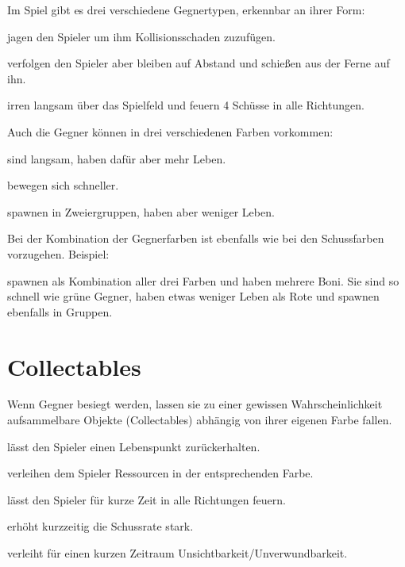 \documentclass[a4paper,10pt,ngerman,fontsize=12pt]{scrreprt}
\begin{document}
Im Spiel gibt es drei verschiedene Gegnertypen, erkennbar an ihrer Form:

\renewcommand{\itmspace}{4.5em}
{jagen den Spieler um ihm Kollisionsschaden zuzufügen.}

{verfolgen den Spieler aber bleiben auf Abstand und schie{\ss}en aus der Ferne auf ihn.}

{irren langsam über das Spielfeld und feuern 4 Schüsse in alle Richtungen.}

Auch die Gegner können in drei verschiedenen Farben vorkommen:

\renewcommand{\itmspace}{7.5em}
{sind langsam, haben dafür aber mehr Leben.}

{bewegen sich schneller.}

{spawnen in Zweiergruppen, haben aber weniger Leben.}

Bei der Kombination der Gegnerfarben ist ebenfalls wie bei den Schussfarben vorzugehen. Beispiel:

{spawnen als Kombination aller drei Farben und haben mehrere Boni. Sie sind so schnell wie grüne Gegner, haben etwas weniger Leben als Rote und spawnen ebenfalls in Gruppen.}




\section{Collectables}

Wenn Gegner besiegt werden, lassen sie zu einer gewissen Wahrscheinlichkeit aufsammelbare Objekte (Collectables) abhängig von ihrer eigenen Farbe fallen.

\renewcommand{\itmspace}{5.5em}
{lässt den Spieler einen Lebenspunkt zurückerhalten.}

{verleihen dem Spieler Ressourcen in der entsprechenden Farbe.}

{lässt den Spieler für kurze Zeit in alle Richtungen feuern.}

{erhöht kurzzeitig die Schussrate stark.}

{verleiht für einen kurzen Zeitraum Unsichtbarkeit/Unverwundbarkeit.}
\end{document}
